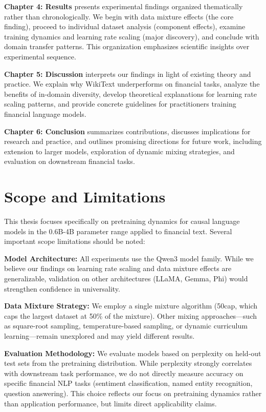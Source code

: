 \textbf{Chapter 4: Results} presents experimental findings organized thematically rather than chronologically. We begin with data mixture effects (the core finding), proceed to individual dataset analysis (component effects), examine training dynamics and learning rate scaling (major discovery), and conclude with domain transfer patterns. This organization emphasizes scientific insights over experimental sequence.

\textbf{Chapter 5: Discussion} interprets our findings in light of existing theory and practice. We explain why WikiText underperforms on financial tasks, analyze the benefits of in-domain diversity, develop theoretical explanations for learning rate scaling patterns, and provide concrete guidelines for practitioners training financial language models.

\textbf{Chapter 6: Conclusion} summarizes contributions, discusses implications for research and practice, and outlines promising directions for future work, including extension to larger models, exploration of dynamic mixing strategies, and evaluation on downstream financial tasks.

\section{Scope and Limitations}

This thesis focuses specifically on pretraining dynamics for causal language models in the 0.6B-4B parameter range applied to financial text. Several important scope limitations should be noted:

\textbf{Model Architecture:} All experiments use the Qwen3 model family. While we believe our findings on learning rate scaling and data mixture effects are generalizable, validation on other architectures (LLaMA, Gemma, Phi) would strengthen confidence in universality.

\textbf{Data Mixture Strategy:} We employ a single mixture algorithm (50cap, which caps the largest dataset at 50\% of the mixture). Other mixing approaches—such as square-root sampling, temperature-based sampling, or dynamic curriculum learning—remain unexplored and may yield different results.

\textbf{Evaluation Methodology:} We evaluate models based on perplexity on held-out test sets from the pretraining distribution. While perplexity strongly correlates with downstream task performance, we do not directly measure accuracy on specific financial NLP tasks (sentiment classification, named entity recognition, question answering). This choice reflects our focus on pretraining dynamics rather than application performance, but limits direct applicability claims.

